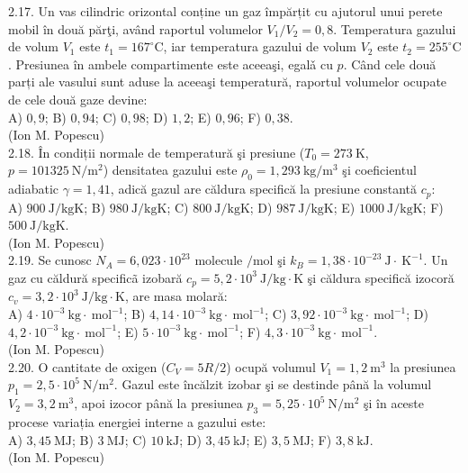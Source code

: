 2.17. Un vas cilindric orizontal conține un gaz împărțit cu ajutorul unui perete mobil în două părţi, având raportul volumelor $V_{1} / V_{2}=0,8$. Temperatura gazului de volum $V_{1}$ este $t_{1}=167^{\circ} \mathrm{C}$, iar temperatura gazului de volum $V_{2}$ este $t_{2}=255^{\circ} \mathrm{C}$. Presiunea în ambele compartimente este aceeaşi, egalǎ cu $p$. Când cele două parți ale vasului sunt aduse la aceeaşi temperatură, raportul volumelor ocupate de cele două gaze devine:\\ A) $0,9$; B) $0,94$; C) $0,98$; D) $1,2$; E) $0,96$; F) $0,38$.\\ (Ion M. Popescu)\\

2.18. În condiții normale de temperatură şi presiune ($T_{0}=273 \mathrm{~K}$, $p=101325 \mathrm{~N} / \mathrm{m}^{2}$) densitatea gazului este $\rho_{0}=1,293 \mathrm{~kg} / \mathrm{m}^{3}$ şi coeficientul adiabatic $\gamma=1,41$, adică gazul are căldura specifică la presiune constantă $c_{p}$:\\ A) $900 \mathrm{~J} / \mathrm{kgK}$; B) $980 \mathrm{~J} / \mathrm{kgK}$; C) $800 \mathrm{~J} / \mathrm{kgK}$; D) $987 \mathrm{~J} / \mathrm{kgK}$; E) $1000 \mathrm{~J} / \mathrm{kgK}$; F) $500 \mathrm{~J} / \mathrm{kgK}$.\\ (Ion M. Popescu)\\

2.19. Se cunosc $N_{A}=6,023 \cdot 10^{23}$ molecule $/ \mathrm{mol}$ şi $k_{B}=1,38 \cdot 10^{-23} \mathrm{~J} \cdot \mathrm{~K}^{-1}$. Un gaz cu căldură specificã izobară $c_{p}=5,2 \cdot 10^{3} \mathrm{~J} / \mathrm{kg} \cdot \mathrm{K}$ şi căldura specifică izocoră $c_{v}=3,2 \cdot 10^{3} \mathrm{~J} / \mathrm{kg} \cdot \mathrm{K}$, are masa molară:\\ A) $4 \cdot 10^{-3} \mathrm{~kg} \cdot \mathrm{~mol}^{-1}$; B) $4,14 \cdot 10^{-3} \mathrm{~kg} \cdot \mathrm{~mol}^{-1}$; C) $3,92 \cdot 10^{-3} \mathrm{~kg} \cdot \mathrm{~mol}^{-1}$; D) $4,2 \cdot 10^{-3} \mathrm{~kg} \cdot \mathrm{~mol}^{-1}$; E) $5 \cdot 10^{-3} \mathrm{~kg} \cdot \mathrm{~mol}^{-1}$; F) $4,3 \cdot 10^{-3} \mathrm{~kg} \cdot \mathrm{~mol}^{-1}$.\\ (Ion M. Popescu)\\

2.20. O cantitate de oxigen ($C_{V}=5 R / 2$) ocupă volumul $V_{1}=1,2 \mathrm{~m}^{3}$ la presiunea $p_{1}=2,5 \cdot 10^{5} \mathrm{~N} / \mathrm{m}^{2}$. Gazul este încălzit izobar şi se destinde până la volumul $V_{2}=3,2 \mathrm{~m}^{3}$, apoi izocor până la presiunea $p_{3}=5,25 \cdot 10^{5} \mathrm{~N} / \mathrm{m}^{2}$ şi în aceste procese variația energiei interne a gazului este:\\ A) $3,45 \mathrm{~MJ}$; B) $3 \mathrm{~MJ}$; C) $10 \mathrm{~kJ}$; D) $3,45 \mathrm{~kJ}$; E) $3,5 \mathrm{~MJ}$; F) $3,8 \mathrm{~kJ}$.\\ (Ion M. Popescu)\\

